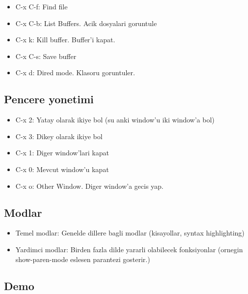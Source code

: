 \documentclass[11pt]{article}
\begin{document}
\begin{itemize}
\item C-x C-f: Find file

\item C-x C-b: List Buffers. Acik dosyalari goruntule

\item C-x k: Kill buffer. Buffer'i kapat.

\item C-x C-s: Save buffer

\item C-x d: Dired mode. Klasoru goruntuler.
\end{itemize}

\subsection{Pencere yonetimi}
\label{sec-2-6}

\begin{itemize}
\item C-x 2: Yatay olarak ikiye bol (su anki window'u iki window'a bol)

\item C-x 3: Dikey olarak ikiye bol

\item C-x 1: Diger window'lari kapat

\item C-x 0: Mevcut window'u kapat

\item C-x o: Other Window. Diger window'a gecis yap.
\end{itemize}

\subsection{Modlar}
\label{sec-2-7}

\begin{itemize}
\item Temel modlar: Genelde dillere bagli modlar (kisayollar, syntax
highlighting)

\item Yardimci modlar: Birden fazla dilde yararli olabilecek fonksiyonlar
(ornegin show-paren-mode eslesen parantezi gosterir.)
\end{itemize}

\subsection{Demo}
\label{sec-2-8}
\end{document}

